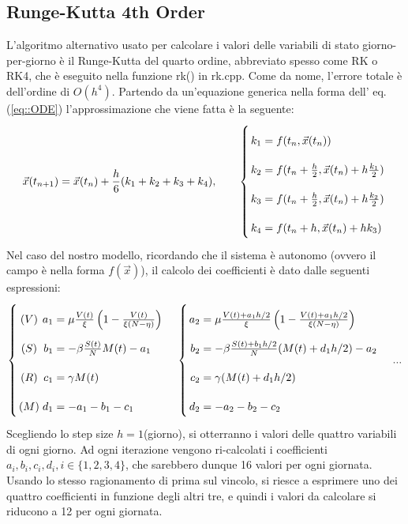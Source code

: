 \documentclass{article}
\begin{document}
\subsection{Runge-Kutta 4th Order}
L'algoritmo alternativo usato per calcolare i valori delle variabili di 
stato giorno-per-giorno è il Runge-Kutta del quarto ordine, abbreviato 
spesso come RK o RK4, che è eseguito nella funzione rk() in rk.cpp.
Come da nome, l'errore totale è dell'ordine di $O(h^4)$.
Partendo da un'equazione generica nella forma dell' eq. (\ref{eq::ODE})
l'approssimazione che viene fatta è la seguente: \\
\begin{equation} \label{eq::rk4}
    \vec{x}(t_{n+1})=\vec{x}(t_n)+\frac{h}{6}(k_1+k_2+k_3+k_4), \qquad
    \left\{ \arraycolsep=1.4pt\def\arraystretch{2.2}
    \begin{array}{rcl}
    k_1 & = & f(t_n, \vec{x}(t_n)) \\
    k_2 & = & f(t_n+\frac{h}{2}, \vec{x}(t_n)+h\frac{k_1}{2}) \\
    k_3 & = & f(t_n+\frac{h}{2}, \vec{x}(t_n)+h\frac{k_2}{2}) \\
    k_4 & = & f(t_n+h, \vec{x}(t_n)+hk_3) \\
    \end{array}\right.
\end{equation}
Nel caso del nostro modello, ricordando che il sistema è autonomo (ovvero
il campo è nella forma $f(\vec{x})$), il calcolo dei coefficienti è dato 
dalle seguenti espressioni:
\begin{equation} \label{eq::rk4Coeff}
    \left\{ \arraycolsep=1.4pt\def\arraystretch{2.2}
    \begin{array}{crcl}
    (V) & a_1 & = & \mu \frac{V(t)}{\xi}\left(1-\frac{V(t)}
    {\xi(N-\eta)}\right) \\
    (S) & b_1 & = &  -\beta\frac{S(t)}{N}M(t)-a_1\\
    (R) & c_1 & = &  \gamma M(t)\\
    (M) & d_1 & = &  -a_1-b_1-c_1 \\
    \end{array}\right. \quad
    \left\{ \arraycolsep=1.4pt\def\arraystretch{2.2}
    \begin{array}{rcl}
    a_2 & = & \mu \frac{V(t) + a_1 h/2}{\xi}\left(1-\frac{V(t)+
    a_1 h/2}{\xi(N-\eta)}\right) \\
    b_2 & = &  -\beta\frac{S(t)+b_1 h/2}{N}(M(t)+d_1 h/2)-a_2\\
    c_2 & = &  \gamma (M(t)+d_1 h/2)\\
    d_2 & = &  -a_2-b_2-c_2 \\
    \end{array}\right. \quad ...
\end{equation}
Scegliendo lo step size $h=1$(giorno), si otterranno i valori delle 
quattro variabili di ogni giorno. Ad ogni iterazione vengono ri-calcolati
i coefficienti $a_i, b_i, c_i,d_i, i \in \{1,2,3,4\}$, che sarebbero dunque
16 valori per ogni giornata. Usando lo stesso ragionamento di prima sul 
vincolo, si riesce a esprimere uno dei quattro coefficienti in funzione 
degli altri  tre, e quindi i valori da calcolare si riducono a 12 per ogni 
giornata.\\
\end{document}
